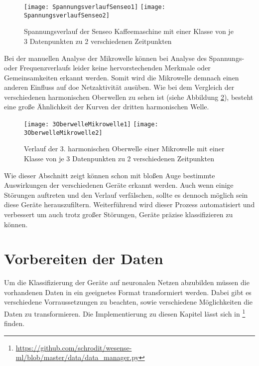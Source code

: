     \begin{figure}[H]
        \centering
        \texttt{[image: SpannungsverlaufSenseo1]}
        \texttt{[image: SpannungsverlaufSenseo2]}
        \caption{Spannungsverlauf der Senseo Kaffeemaschine mit einer Klasse von je 3 Datenpunkten zu 2 verschiedenen Zeitpunkten}
        \label{fig:SpannungsverlaufSenseo}
    \end{figure}

    \noindent
    Bei der manuellen Analyse der Mikrowelle können bei Analyse des Spannungs- oder Frequenzverlaufs leider keine hervorstechenden Merkmale oder Gemeinsamkeiten erkannt werden.
    Somit wird die Mikrowelle demnach einen anderen Einfluss auf doe Netzaktivität ausüben.
    Wie bei dem Vergleich der verschiedenen harmonischen Oberwellen zu sehen ist (siehe Abbildung \ref{fig:3OberwelleMikrowelle}), besteht eine große Ähnlichkeit der Kurven der dritten harmonischen Welle.\\

    \begin{figure}[H]
        \centering
        \texttt{[image: 3OberwelleMikrowelle1]}
        \texttt{[image: 3OberwelleMikrowelle2]}
        \caption{Verlauf der 3. harmonischen Oberwelle einer Mikrowelle mit einer Klasse von je 3 Datenpunkten zu 2 verschiedenen Zeitpunkten}
        \label{fig:3OberwelleMikrowelle}
    \end{figure}

    \noindent
    Wie dieser Abschnitt zeigt können schon mit bloßen Auge bestimmte Auswirkungen der verschiedenen Geräte erkannt werden.
    Auch wenn einige Störungen auftreten und den Verlauf verfälschen, sollte es dennoch möglich sein diese Geräte herauszufiltern.
    Weiterführend wird dieser Prozess automatisiert und verbessert um auch trotz großer Störungen, Geräte präzise klassifizieren zu können. 

\section{Vorbereiten der Daten}\label{VorbereitenDerDaten}
    Um die Klassifizierung der Geräte auf neuronalen Netzen abzubilden müssen die vorhandenen Daten in ein geeignetes Format transformiert werden.
    Dabei gibt es verschiedene Vorraussetzungen zu beachten, sowie verschiedene Möglichkeiten die Daten zu transformieren.
    Die Implementierung zu diesen Kapitel lässt sich in \footnote{\url{https://github.com/schrodit/wesense-ml/blob/master/data/data_manager.py}} finden.\\
    
